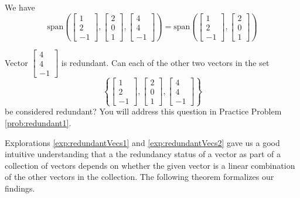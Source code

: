 \documentclass{ximera}
\begin{document}
\begin{exploration}
We have
$$\mbox{span}\left(\begin{bmatrix}1\\2\\-1\end{bmatrix},\begin{bmatrix}2\\0\\1\end{bmatrix},\begin{bmatrix}4\\4\\-1\end{bmatrix}\right)=\mbox{span}\left(\begin{bmatrix}1\\2\\-1\end{bmatrix},\begin{bmatrix}2\\0\\1\end{bmatrix}\right)$$

 Vector $\begin{bmatrix}4\\4\\-1\end{bmatrix}$ is redundant.  Can each of the other two vectors in the set 
 $$\left\{\begin{bmatrix}1\\2\\-1\end{bmatrix},\begin{bmatrix}2\\0\\1\end{bmatrix},\begin{bmatrix}4\\4\\-1\end{bmatrix}\right\}$$ be considered redundant?  You will address this question in Practice Problem \ref{prob:redundant1}.
\end{exploration}
 Explorations \ref{exp:redundantVecs1} and \ref{exp:redundantVecs2} gave us a good intuitive understanding that a the redundancy status of a vector as part of a collection of vectors depends on whether the given vector is a linear combination of the other vectors in the collection.  The following theorem formalizes our findings.
\end{document}
